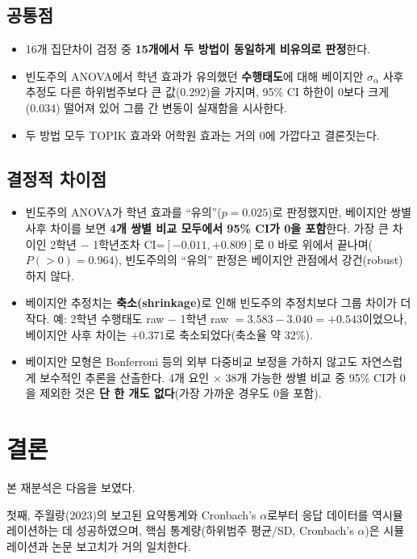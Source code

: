\documentclass[11pt]{article}
\begin{document}
\subsection{공통점}
\begin{itemize}
\item 16개 집단차이 검정 중 \textbf{15개에서 두 방법이 동일하게 비유의로 판정}한다.
\item 빈도주의 ANOVA에서 학년 효과가 유의했던 \textbf{수행태도}에 대해 베이지안 $\sigma_\alpha$ 사후추정도 다른 하위범주보다 큰 값($0.292$)을 가지며, 95\% CI 하한이 0보다 크게(0.034) 떨어져 있어 그룹 간 변동이 실재함을 시사한다.
\item 두 방법 모두 TOPIK 효과와 어학원 효과는 거의 0에 가깝다고 결론짓는다.
\end{itemize}

\subsection{결정적 차이점}
\begin{itemize}
\item 빈도주의 ANOVA가 학년 효과를 ``유의''($p=0.025$)로 판정했지만, 베이지안 쌍별 사후 차이를 보면 \textbf{4개 쌍별 비교 모두에서 95\% CI가 0을 포함}한다. 가장 큰 차이인 2학년 $-$ 1학년조차 CI=$[-0.011, +0.809]$로 0 바로 위에서 끝나며($P(>0) = 0.964$), 빈도주의의 ``유의'' 판정은 베이지안 관점에서 강건(robust)하지 않다.

\item 베이지안 추정치는 \textbf{축소(shrinkage)}로 인해 빈도주의 추정치보다 그룹 차이가 더 작다. 예: 2학년 수행태도 raw $-$ 1학년 raw $= 3.583-3.040 = +0.543$이었으나, 베이지안 사후 차이는 $+0.371$로 축소되었다(축소율 약 32\%).

\item 베이지안 모형은 Bonferroni 등의 외부 다중비교 보정을 가하지 않고도 자연스럽게 보수적인 추론을 산출한다. 4개 요인 $\times$ 38개 가능한 쌍별 비교 중 95\% CI가 0을 제외한 것은 \textbf{단 한 개도 없다}(가장 가까운 경우도 0을 포함).
\end{itemize}

\section{결론}

본 재분석은 다음을 보였다.

첫째, 주월랑(2023)의 보고된 요약통계와 Cronbach's $\alpha$로부터 응답 데이터를 역시뮬레이션하는 데 성공하였으며, 핵심 통계량(하위범주 평균/SD, Cronbach's $\alpha$)은 시뮬레이션과 논문 보고치가 거의 일치한다.
\end{document}
